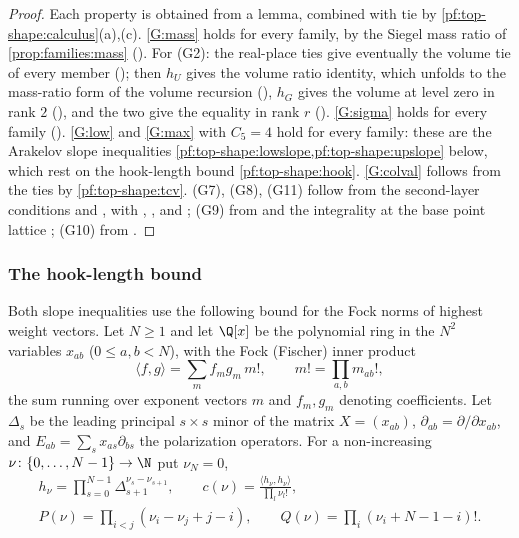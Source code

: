 \begin{proof}
Each property is obtained from a lemma, combined with $\mathrm{tie}$ by \cref{pf:top-shape:calculus}(a),(c).
\ref{G:mass} holds for every family, by the Siegel mass ratio of \cref{prop:families:mass}
(). For (G2): the real-place
ties give eventually the volume tie of every member
(); then $h_U$ gives the volume ratio identity, which
unfolds to the mass-ratio form of the volume recursion
(), $h_G$ gives the volume at level zero in
rank $2$ (), and the two give
the equality in rank $r$ ().
\ref{G:sigma} holds for every family ().
\ref{G:low} and \ref{G:max} with $C_5=4$ hold for every family: these are the Arakelov slope inequalities
\cref{pf:top-shape:lowslope,pf:top-shape:upslope} below, which rest on the hook-length bound \cref{pf:top-shape:hook}.
\ref{G:colval} follows from the ties by \cref{pf:top-shape:tcv}. (G7), (G8), (G11) follow from the
second-layer conditions and , with
, , and ;
(G9) from  and the integrality at the base point lattice
; (G10) from
.
\end{proof}

\subsubsection*{The hook-length bound}

Both slope inequalities use the following bound for the Fock norms of highest weight vectors. Let $N\ge1$ and let
$\Q[x]$ be the polynomial ring in the $N^2$ variables $x_{ab}$ ($0\le a,b<N$), with the Fock (Fischer) inner product
\[
\langle f,g\rangle=\sum_mf_mg_m\,m!,\qquad m!=\prod_{a,b}m_{ab}!,
\]
the sum running over exponent vectors $m$ and $f_m,g_m$ denoting coefficients. Let $\Delta_s$ be the leading principal
$s\times s$ minor of the matrix $X=(x_{ab})$, $\partial_{ab}=\partial/\partial x_{ab}$, and
$E_{ab}=\sum_sx_{as}\partial_{bs}$ the polarization operators. For a non-increasing $\nu\colon\{0,\dots,N-1\}\to\N$ put
$\nu_N=0$,
\begin{gather*}
h_\nu=\prod_{s=0}^{N-1}\Delta_{s+1}^{\nu_s-\nu_{s+1}},\qquad c(\nu)=\frac{\langle h_\nu,h_\nu\rangle}{\prod_l\nu_l!},\\
P(\nu)=\prod_{i<j}(\nu_i-\nu_j+j-i),\qquad Q(\nu)=\prod_i(\nu_i+N-1-i)!.
\end{gather*}


